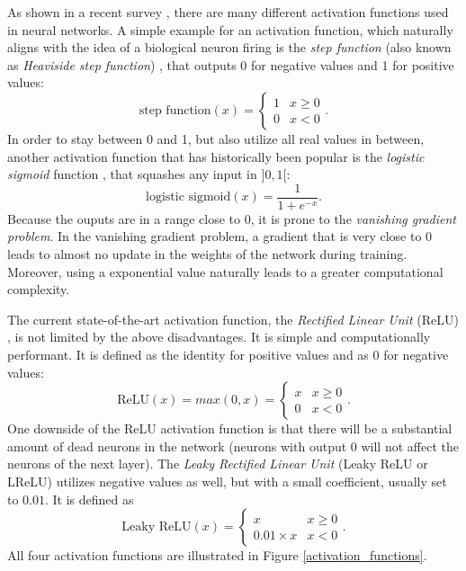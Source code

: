 As shown in a recent survey \cite{activation_functions}, there are many different activation functions used in neural networks. A simple example for an activation function, which naturally aligns with the idea of a biological neuron firing is the \textit{step function} (also known as \textit{Heaviside step function}) \cite{neural_networks_pattern_recognition}, that outputs 0 for negative values and 1 for positive values:
$$\text{step function}(x) = 
\begin{cases}
    1 & x \geq 0\\
    0 & x < 0
\end{cases}.
$$
In order to stay between 0 and 1, but also utilize all real values in between, another activation function that has historically been popular is the \textit{logistic sigmoid} function \cite{activation_functions}, that squashes any input in $]0, 1[$:
$$\text{logistic sigmoid}(x) = \frac{1}{1 + e^{-x}}.$$
Because the ouputs are in a range close to 0, it is prone to the \textit{vanishing gradient problem}. In the vanishing gradient problem, a gradient that is very close to 0 leads to almost no update in the weights of the network during training. Moreover, using a exponential value naturally leads to a greater computational complexity. \cite{activation_functions}

The current state-of-the-art activation function, the \textit{Rectified Linear Unit} (ReLU) \cite{activation_functions}, is not limited by the above disadvantages. It is simple and computationally performant. It is defined as the identity for positive values and as 0 for negative values:
$$\text{ReLU}(x) = max(0, x) = 
\begin{cases}
    x & x \geq 0\\
    0 & x < 0
\end{cases}.
$$
One downside of the ReLU activation function is that there will be a substantial amount of dead neurons in the network (neurons with output 0 will not affect the neurons of the next layer). The \textit{Leaky Rectified Linear Unit} (Leaky ReLU or LReLU) \cite{activation_functions} utilizes negative values as well, but with a small coefficient, usually set to $0.01$. It is defined as
$$\text{Leaky ReLU}(x) = 
\begin{cases}
    x & x \geq 0\\
    0.01 \times x & x < 0
\end{cases}.
$$
All four activation functions are illustrated in Figure \ref{activation_functions}.

